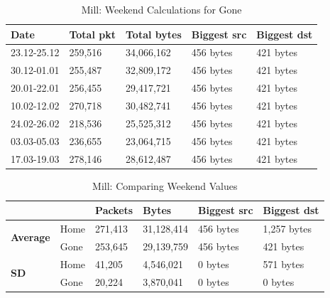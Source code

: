 \begin{table}[H]
    \centering
    \caption{Mill: Weekend Calculations for Gone}
    \begin{tabular}{|l|l|l|l|l|}
        \hline
        \textbf{Date}    & \textbf{Total pkt} & \textbf{Total bytes} & \textbf{Biggest src} & \textbf{Biggest dst} \\ \hline
        23.12-25.12      & 259,516            & 34,066,162           & 456 bytes            & 421 bytes            \\ \hline
        30.12-01.01      & 255,487            & 32,809,172           & 456 bytes            & 421 bytes            \\ \hline
        20.01-22.01      & 256,455            & 29,417,721           & 456 bytes            & 421 bytes            \\ \hline
        10.02-12.02      & 270,718            & 30,482,741           & 456 bytes            & 421 bytes            \\ \hline
        24.02-26.02      & 218,536            & 25,525,312           & 456 bytes            & 421 bytes            \\ \hline
        03.03-05.03      & 236,655            & 23,064,715           & 456 bytes            & 421 bytes            \\ \hline
        17.03-19.03      & 278,146            & 28,612,487           & 456 bytes            & 421 bytes            \\ \hline
    \end{tabular}
    \label{tab:MillGoneWeekends}
\end{table}

\begin{table}[H]
    \centering
    \caption{Mill: Comparing Weekend Values}
    \begin{tabular}{ll|l|l|l|l|}
        \cline{3-6}
        \textbf{}                                           & \textbf{} & \textbf{Packets} & \textbf{Bytes} & \textbf{Biggest src} & \textbf{Biggest dst} \\ \hline
        \multicolumn{1}{|l|}{\multirow{2}{*}{\textbf{Average}}} & Home      & 271,413          & 31,128,414      & 456 bytes            & 1,257 bytes          \\ \cline{2-6} 
        \multicolumn{1}{|l|}{}                              & Gone      & 253,645          & 29,139,759      & 456 bytes            & 421 bytes            \\ \hline
        \multicolumn{1}{|l|}{\multirow{2}{*}{\textbf{SD}}}  & Home      & 41,205           & 4,546,021      & 0 bytes              & 571 bytes            \\ \cline{2-6} 
        \multicolumn{1}{|l|}{}                              & Gone      & 20,224           & 3,870,041       & 0 bytes              & 0 bytes              \\ \hline
    \end{tabular}
    \label{tab:MillWeekends}
\end{table}

